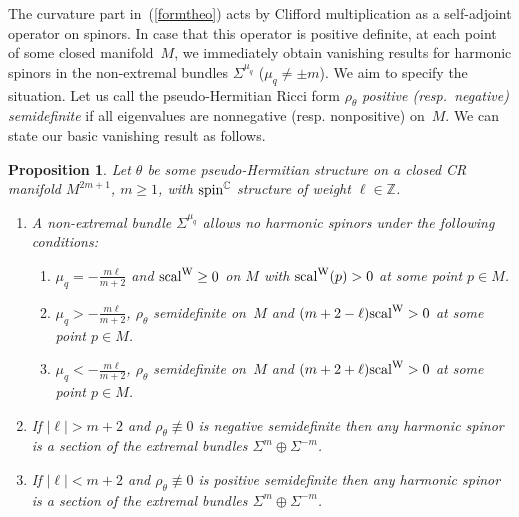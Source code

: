 \documentclass[pdftex]{sigma}
\numberwithin{equation}{section}
\newtheorem{Proposition}[Theorem]{Proposition}
 { \theoremstyle{definition}
\newtheorem{Definition}[Theorem]{Definition}
\newtheorem{Example}[Theorem]{Example}
\newtheorem{Remark}[Theorem]{Remark} }
\newcommand{\ZZ}{\mathbb{Z}}
\newcommand{\CC}{\mathbb{C}}
\begin{document}
The curvature part in~(\ref{formtheo}) acts by Clifford multiplication as a self-adjoint operator on spinors. In case that this operator is positive definite, at each point
of some closed manifold~$M$,
we immediately obtain vanishing results for harmonic spinors in the non-extremal bundles $\Sigma^{\mu_q}$ ($\mu_q\neq \pm m$).
We aim to specify the situation.
Let us call the pseudo-Hermitian Ricci form $\rho_\theta$ {\em positive (resp.\ negative) semidefinite} if all eigenvalues are nonnegative (resp. nonpositive) on~$M$.
We can state our basic vanishing result as follows.

\begin{Proposition} \label{vani} Let $\theta$ be some pseudo-Hermitian structure on a closed CR manifold $M^{2m+1}$,
$m\geq 1$, with ${\rm spin}^\CC$ structure of weight $\ell\in \ZZ$.
\begin{enumerate}\itemsep=0pt
\item[$(a)$] A non-extremal bundle $\Sigma^{\mu_q}$ allows no harmonic spinors under the following conditions:
\begin{enumerate}\itemsep=0pt
\item[$(1)$] $\mu_q=-\frac{m\ell}{m+2}$ and ${\rm scal}^{\rm W}\geq 0$ on $M$ with ${\rm scal}^{\rm W}(p)>0$ at some point $p\in M$.
\item[$(2)$] $\mu_q>-\frac{m\ell}{m+2}$, $\rho_\theta$ semidefinite on~$M$ and $(m+2-\ell){\rm scal}^{\rm W}>0$ at some point $p\in M$.
\item[$(3)$] $\mu_q<-\frac{m\ell}{m+2}$, $\rho_\theta$ semidefinite on~$M$ and $(m+2+\ell){\rm scal}^{\rm W}>0$ at some point $p\in M$.
\end{enumerate}
\item[$(b)$] If $|\ell|>m+2$ and $\rho_\theta\not\equiv 0$ is negative semidefinite then
any harmonic spinor is a section of the extremal bundles $\Sigma^m\oplus \Sigma^{-m}$.
\item[$(c)$] If $|\ell|<m+2$ and $\rho_\theta\not\equiv 0$ is positive semidefinite then
any harmonic spinor is a section of the extremal bundles $\Sigma^m\oplus \Sigma^{-m}$.
\end{enumerate}
\end{Proposition}
\end{document}
